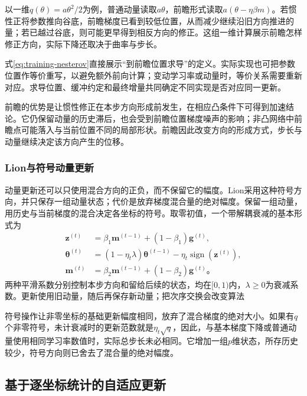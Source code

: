 以一维$q(\theta)=a\theta^2/2$为例，普通动量读取$a\theta$，前瞻形式读取$a(\theta-\eta\beta m)$。若惯性正将参数推向谷底，前瞻梯度已看到较低位置，从而减少继续沿旧方向推进的量；若已越过谷底，则可能更早得到相反方向的修正。这组一维计算展示前瞻怎样修正方向，实际下降还取决于曲率与步长。

式\eqref{eq:training-nesterov}直接展示“到前瞻位置求导”的定义。实际实现也可把参数位置作等价重写，以避免额外前向计算；变动学习率或动量时，等价关系需要重新对应。求导位置、缓冲约定和最终增量共同确定不同实现是否对应同一更新。

前瞻的优势是让惯性修正在本步方向形成前发生，在相应凸条件下可得到加速结论。它仍保留动量的历史滞后，也会受到前瞻位置梯度噪声的影响；非凸网络中前瞻点可能落入与当前位置不同的局部形状。前瞻因此改变方向的形成方式，步长与动量继续决定该方向产生的位移。

\subsubsection{Lion与符号动量更新}
\label{sec:training-lion}

动量更新还可以只使用混合方向的正负，而不保留它的幅度。Lion采用这种符号方向，并只保存一组动量状态；代价是放弃梯度混合量的绝对幅度。保留一组动量，用历史与当前梯度的混合决定各坐标的符号。取零初值，一个带解耦衰减的基本形式为
\begin{align}
  \bm z^{(t)}&=\beta_1\bm m^{(t-1)}+(1-\beta_1)\bm g^{(t)},\\
  \bm\theta^{(t)}&=(1-\eta_t\lambda)\bm\theta^{(t-1)}
      -\eta_t\operatorname{sign}(\bm z^{(t)}),\\
  \bm m^{(t)}&=\beta_2\bm m^{(t-1)}+(1-\beta_2)\bm g^{(t)}\text{。}
  \label{eq:training-lion}
\end{align}
两种平滑系数分别控制本步方向和留给后续的状态，均在$[0,1)$内，$\lambda\geq0$为衰减系数。更新使用旧动量，随后再保存新动量；把次序交换会改变算法

符号操作让非零坐标的基础更新幅度相同，放弃了混合梯度的绝对大小。如果有$q$个非零符号，未计衰减时的更新范数就是$\eta_t\sqrt q$，因此，与基本梯度下降或普通动量使用相同学习率数值时，实际总步长未必相同。它增加一组$p$维状态，所存历史较少，符号方向则已舍去了混合量的绝对幅度。

\subsection{基于逐坐标统计的自适应更新}
\label{sec:training-coordinate-adaptation}

